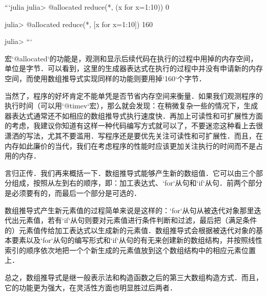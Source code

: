 ```julia
julia> @allocated reduce(*, (x for x=1:10))
0

julia> @allocated reduce(*, [x for x=1:10])
160

julia> 
```

宏`@allocated`的功能是，观测和显示后续代码在执行的过程中用掉的内存空间，单位是字节．可以看到，这里的生成器表达式在执行的过程中并没有申请新的内存空间，而使用数组推导式实现同样的功能则要用掉`160`个字节．

当然了，程序的好坏肯定不能单凭是否节省内存空间来衡量．如果我们观测程序的执行时间（可以用`@timev`宏），那么就会发现：在稍微复杂一些的情况下，生成器表达式通常还不如相应的数组推导式执行速度快．再加上可读性和可扩展性方面的考虑，我建议你知道有这样一种代码编写方式就可以了，不要迷恋这种看上去很潇洒的写法，尤其不要滥用．写程序还是要优先关注可读性和可扩展性．而且，在内存如此廉价的当代，我们在考虑程序的性能时应该更加关注执行的时间而不是占用的内存．

言归正传．我们再来概括一下．数组推导式能够产生新的数组值．它可以由三个部分组成，按照从左到右的顺序，即：加工表达式、`for`从句和`if`从句．前两个部分是必须要有的，而最后一个部分是可选的．

数组推导式产生新元素值的过程简单来说是这样的：`for`从句从被迭代对象那里迭代出元素值，若有`if`从句则要对元素值进行条件判断和过滤，最后把（满足条件的）元素值传给加工表达式以生成新的元素值．数组推导式会根据被迭代对象的基本要素以及`for`从句的编写形式和`if`从句的有无来创建新的数组结构，并按照线性索引的顺序依次地把一个个新生成的元素值放到这个数组结构中的相应元素位置上．

总之，数组推导式是继一般表示法和构造函数之后的第三大数组构造方式．而且，它的功能更为强大，在灵活性方面也明显胜过后两者．